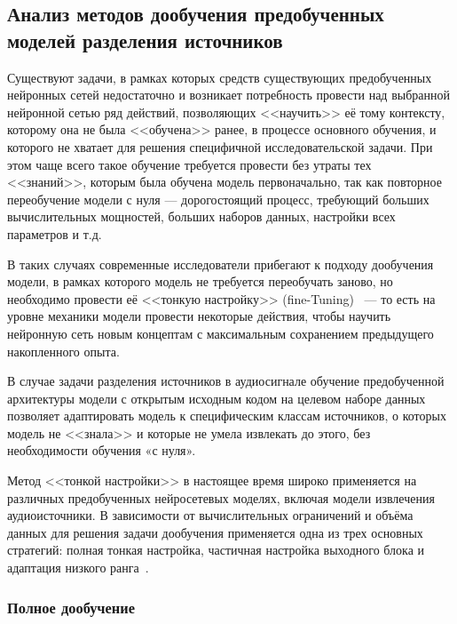 \documentclass[14pt]{extarticle}
\begin{document}
\subsection{Анализ методов дообучения предобученных моделей разделения источников}

Существуют задачи, в рамках которых средств существующих предобученных нейронных сетей недостаточно и возникает потребность
провести над выбранной нейронной сетью ряд действий, позволяющих <<научить>> её тому контексту, которому она не была
<<обучена>> ранее, в процессе основного обучения, и которого не хватает для решения специфичной исследовательской задачи. 
При этом чаще всего такое обучение требуется провести без утраты тех <<знаний>>, которым была обучена модель первоначально,
 так как повторное переобучение модели с нуля --- дорогостоящий процесс, требующий больших вычислительных мощностей, больших 
 наборов данных, настройки всех параметров и т.д.

В таких случаях современные исследователи прибегают к подходу дообучения модели, в рамках которого модель не требуется переобучать
заново, но необходимо провести её <<тонкую настройку>> (fine-Tuning)~\cite{finetune, goodfellow} --- то есть на уровне механики модели провести некоторые действия, чтобы
научить нейронную сеть новым концептам с максимальным сохранением предыдущего накопленного опыта.

В случае задачи разделения источников в аудиосигнале обучение предобученной архитектуры модели с открытым исходным кодом 
на целевом наборе данных позволяет адаптировать модель к специфическим классам источников, о которых  модель не <<знала>>
 и которые не умела извлекать до этого, без необходимости обучения «с нуля».

Метод <<тонкой настройки>> в настоящее время широко применяется на различных предобученных нейросетевых моделях, включая модели извлечения аудиоисточники.
В зависимости от вычислительных ограничений и объёма данных для решения задачи дообучения применяется одна из трех основных стратегий: 
полная тонкая настройка, частичная настройка выходного блока и адаптация низкого ранга~\cite{finetune2}.


\subsubsection{Полное дообучение}
\end{document}
